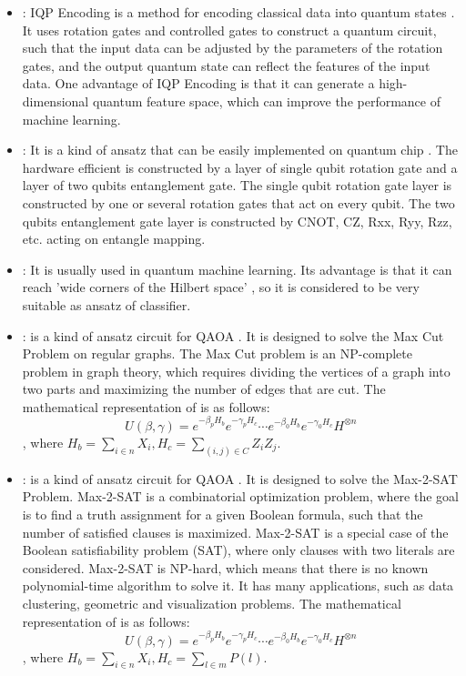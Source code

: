\begin{itemize}
    \item \IQPEncoding: IQP Encoding is a method for encoding classical data into quantum states \cite{Havlíček2019}. It uses rotation gates and controlled gates to construct a quantum circuit, such that the input data can be adjusted by the parameters of the rotation gates, and the output quantum state can reflect the features of the input data. One advantage of IQP Encoding is that it can generate a high-dimensional quantum feature space, which can improve the performance of machine learning.

    \item \HardwareEfficientAnsatz: It is a kind of ansatz that can be easily implemented on quantum chip \cite{Kandala2017}. The hardware efficient is constructed by a layer of single qubit rotation gate and a layer of two qubits entanglement gate. The single qubit rotation gate layer is constructed by one or several rotation gates that act on every qubit. The two qubits entanglement gate layer is constructed by CNOT, CZ, Rxx, Ryy, Rzz, etc. acting on entangle mapping.

    \item \StronglyEntangling: It is usually used in quantum machine learning. Its advantage is that it can reach 'wide corners of the Hilbert space' \cite{Schuld_2020}, so it is considered to be very suitable as ansatz of classifier.

    \item \MaxCutAnsatz: \MaxCutAnsatz is a kind of ansatz circuit for QAOA \cite{farhi2014quantum}. It is designed to solve the Max Cut Problem on regular graphs. The Max Cut problem is an NP-complete problem in graph theory, which requires dividing the vertices of a graph into two parts and maximizing the number of edges that are cut. The mathematical representation of \MaxCutAnsatz is as follows:
          $$U(\beta, \gamma) = e^{-\beta_pH_b}e^{-\gamma_pH_c}
              \cdots e^{-\beta_0H_b}e^{-\gamma_0H_c}H^{\otimes n}$$,
          where $H_b = \sum_{i\in n}X_{i}, H_c = \sum_{(i,j)\in C}Z_iZ_j$.

    \item \MaxToSATAnsatz: \MaxToSATAnsatz is a kind of ansatz circuit for QAOA \cite{Akshay_2020}. It is designed to solve the Max-2-SAT Problem. Max-2-SAT is a combinatorial optimization problem, where the goal is to find a truth assignment for a given Boolean formula, such that the number of satisfied clauses is maximized. Max-2-SAT is a special case of the Boolean satisfiability problem (SAT), where only clauses with two literals are considered. Max-2-SAT is NP-hard, which means that there is no known polynomial-time algorithm to solve it. It has many applications, such as data clustering, geometric and visualization problems. The mathematical representation of \MaxToSATAnsatz is as follows:
          $$U(\beta, \gamma) = e^{-\beta_pH_b}e^{-\gamma_pH_c}
              \cdots e^{-\beta_0H_b}e^{-\gamma_0H_c}H^{\otimes n}$$,
          where $H_b = \sum_{i\in n}X_{i}, H_c = \sum_{l\in m}P(l)$.


\end{itemize}
